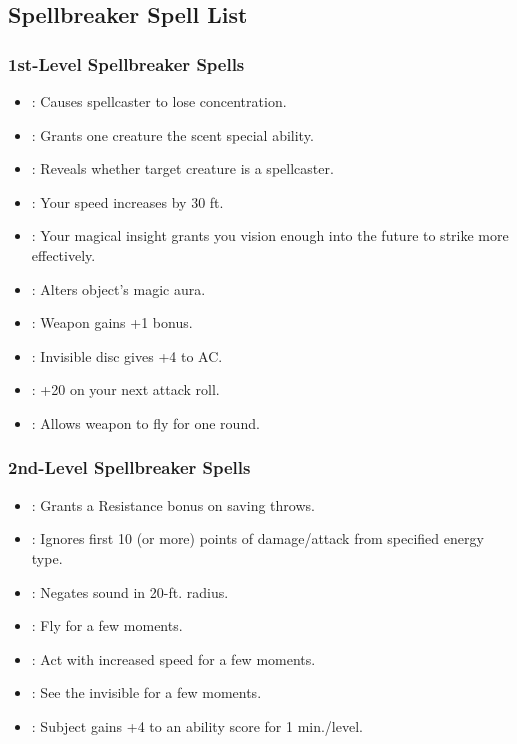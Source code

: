 \subsection{Spellbreaker Spell List}
\subsubsection{1st-Level Spellbreaker Spells}
\begin{itemize}
  \item {}: Causes spellcaster to lose concentration.
  \item {}: Grants one creature the scent special ability.
  \item {}: Reveals whether target creature is a spellcaster.
  \item {}: Your speed increases by 30 ft.
  \item {}: Your magical insight grants you vision enough into the future to strike more effectively.
  \item {}: Alters object's magic aura.
  \item {}: Weapon gains +1 bonus.
  \item {}: Invisible disc gives +4 to AC.
  \item {}: +20 on your next attack roll.
  \item {}: Allows weapon to fly for one round.
\end{itemize}
\subsubsection{2nd-Level Spellbreaker Spells}
\begin{itemize}
  \item {} : Grants a Resistance bonus on saving throws.
  \item {}: Ignores first 10 (or more) points of damage/attack from specified energy type.
  \item {}: Negates sound in 20-ft. radius.
  \item {}: Fly for a few moments.
  \item {}: Act with increased speed for a few moments.
  \item {}: See the invisible for a few moments.
  \item {}: Subject gains +4 to an ability score for 1 min./level.
\end{itemize}
